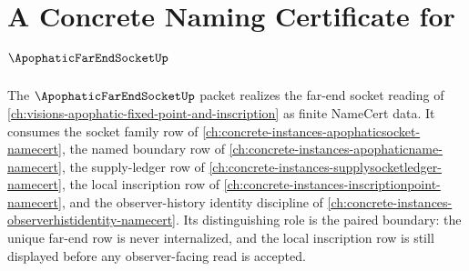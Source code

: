 \chapter{A Concrete Naming Certificate for $\ApophaticFarEndSocketUp$}
\label{ch:concrete-instances-apophaticfarendsocket-namecert}

The $\ApophaticFarEndSocketUp$ packet realizes the far-end socket reading of \autoref{ch:visions-apophatic-fixed-point-and-inscription} as finite NameCert data. It consumes the socket family row of \autoref{ch:concrete-instances-apophaticsocket-namecert}, the named boundary row of \autoref{ch:concrete-instances-apophaticname-namecert}, the supply-ledger row of \autoref{ch:concrete-instances-supplysocketledger-namecert}, the local inscription row of \autoref{ch:concrete-instances-inscriptionpoint-namecert}, and the observer-history identity discipline of \autoref{ch:concrete-instances-observerhistidentity-namecert}. Its distinguishing role is the paired boundary: the unique far-end row is never internalized, and the local inscription row is still displayed before any observer-facing read is accepted.

